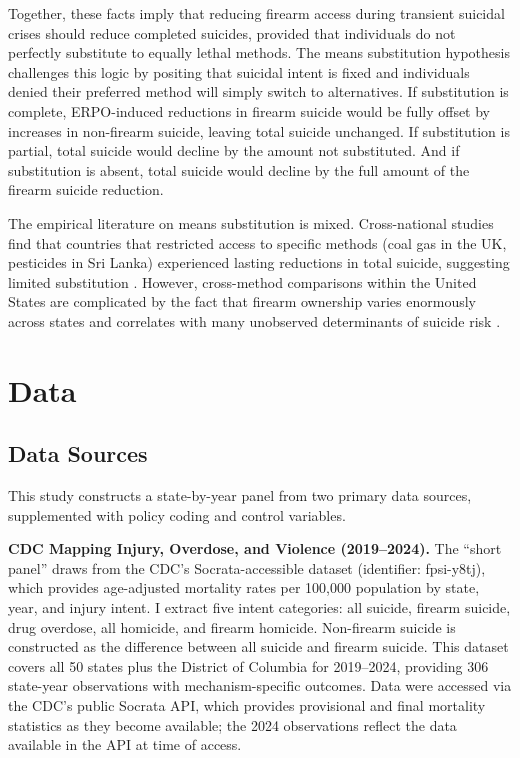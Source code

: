 \documentclass[12pt]{article}
\begin{document}
Together, these facts imply that reducing firearm access during transient suicidal crises should reduce completed suicides, provided that individuals do not perfectly substitute to equally lethal methods. The means substitution hypothesis challenges this logic by positing that suicidal intent is fixed and individuals denied their preferred method will simply switch to alternatives. If substitution is complete, ERPO-induced reductions in firearm suicide would be fully offset by increases in non-firearm suicide, leaving total suicide unchanged. If substitution is partial, total suicide would decline by the amount not substituted. And if substitution is absent, total suicide would decline by the full amount of the firearm suicide reduction.

The empirical literature on means substitution is mixed. Cross-national studies find that countries that restricted access to specific methods (coal gas in the UK, pesticides in Sri Lanka) experienced lasting reductions in total suicide, suggesting limited substitution \citep{daigle2005suicide, mann2005suicide}. However, cross-method comparisons within the United States are complicated by the fact that firearm ownership varies enormously across states and correlates with many unobserved determinants of suicide risk \citep{conner2019reexamining, miller2012firearms}.


\section{Data}

\subsection{Data Sources}

This study constructs a state-by-year panel from two primary data sources, supplemented with policy coding and control variables.

\textbf{CDC Mapping Injury, Overdose, and Violence (2019--2024).} The ``short panel'' draws from the CDC's Socrata-accessible dataset (identifier: fpsi-y8tj), which provides age-adjusted mortality rates per 100,000 population by state, year, and injury intent. I extract five intent categories: all suicide, firearm suicide, drug overdose, all homicide, and firearm homicide. Non-firearm suicide is constructed as the difference between all suicide and firearm suicide. This dataset covers all 50 states plus the District of Columbia for 2019--2024, providing 306 state-year observations with mechanism-specific outcomes. Data were accessed via the CDC's public Socrata API, which provides provisional and final mortality statistics as they become available; the 2024 observations reflect the data available in the API at time of access.
\end{document}

